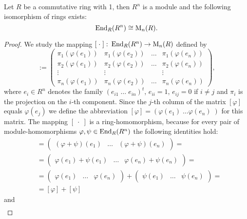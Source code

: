 \begin{pro}\label{prop.Matrix isomorph Homomorphism}
Let $R$ be a commutative ring with 1, then $R^n$ is a module and the following isomorphism of rings exists:
\begin{equation*}
\operatorname{\mathrm{End}}_R(R^n)\cong \mathrm{M}_n(R).
\end{equation*}
\end{pro}
\begin{proof}
We study the mapping $\left[\;\cdot\;\right]\colon\operatorname{\mathrm{End}}_R(R^n)\to\mathrm{M}_n(R)$ defined by
\begin{equation*}
[\varphi]:=
\begin{pmatrix}
\pi_1(\varphi(e_1)) & \pi_1(\varphi(e_2)) & \ldots & \pi_1(\varphi(e_n))\\
\pi_2(\varphi(e_1)) & \pi_2(\varphi(e_2)) & \ldots & \pi_2(\varphi(e_n))\\
\vdots &\vdots & &\vdots\\
\pi_n(\varphi(e_1)) & \pi_n(\varphi(e_2)) & \ldots & \pi_n(\varphi(e_n))
\end{pmatrix},
\end{equation*}
where $e_i\in R^n$ denotes the family $\left(e_{i1}\;\ldots\;e_{in}\right)^t$, $e_{ii}=1$, $e_{ij}=0$ if $i\neq j$ and $\pi_i$ is the projection on the $i$-th component. Since the $j$-th column of the matrix $[\varphi]$ equals $\varphi(e_j)$ we define the abbreviation $[\varphi]=\left(\varphi(e_1)\;\ldots\varphi(e_n)\;\right)$ for this matrix. The mapping $\left[\;\cdot\;\right]$ is a ring-homomorphism, because for every pair of module-homomorphisms $\varphi,\psi\in\operatorname{\mathrm{End}}_R(R^n)$ the following identities hold:
\begin{align*}
[\varphi+\psi]&=\begin{pmatrix}(\varphi+\psi)(e_1) & \dots & (\varphi+\psi)(e_n)\end{pmatrix}=\\
    &=\begin{pmatrix}\varphi(e_1)+\psi(e_1) & \dots & \varphi(e_n)+\psi(e_n)\end{pmatrix}=\\
    &=\begin{pmatrix}\varphi(e_1) & \ldots & \varphi(e_n)\end{pmatrix}+\begin{pmatrix}\psi(e_1) & \ldots & \psi(e_n)\end{pmatrix}=\\
    &=[\varphi]+[\psi]
\end{align*}
and
\begin{align*}

\end{align*}
\end{proof}
